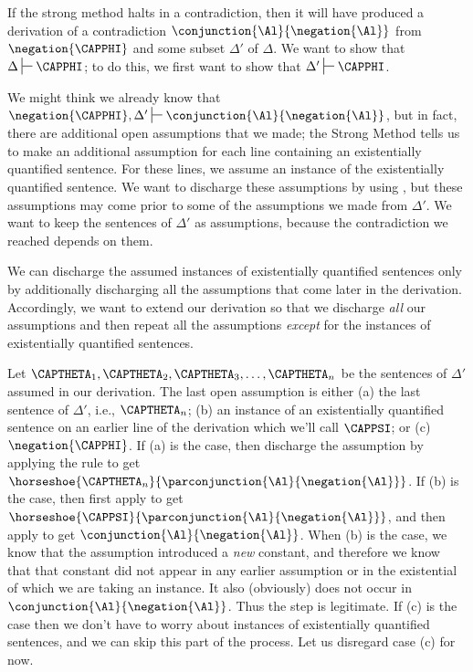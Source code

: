 \begin{PROOF}
If the strong method halts in a contradiction, then it will have produced a derivation of a contradiction $\conjunction{\Al}{\negation{\Al}}$ from $\negation{\CAPPHI}$ and some subset $\Delta'$ of $\Delta$.  We want to show that $\Delta\sststile{}{}\CAPPHI$; to do this, we first want to show that $\Delta'\sststile{}{}\CAPPHI$.

We might think we already know that $\negation{\CAPPHI},\Delta'\sststile{}{}\conjunction{\Al}{\negation{\Al}}$, but in fact, there are additional open assumptions that we made; the Strong Method tells us to make an additional assumption for each line containing an existentially quantified sentence. For these lines, we assume an instance of the existentially quantified sentence.  We want to discharge these assumptions by using , but these assumptions may come prior to some of the assumptions we made from $\Delta'$.  We want to keep the sentences of $\Delta'$ as assumptions, because the contradiction we reached depends on them. 

We can discharge the assumed instances of existentially quantified sentences only by additionally discharging all the assumptions that come later in the derivation.  Accordingly, we want to extend our derivation so that we discharge \emph{all} our assumptions and then repeat all the assumptions \emph{except} for the instances of existentially quantified sentences. 

Let $\CAPTHETA_1, \CAPTHETA_2, \CAPTHETA_3, \ldots, \CAPTHETA_{\integer{n}}$ be the sentences of $\Delta'$ assumed in our derivation.  The last open assumption is either (a) the last sentence of $\Delta'$, i.e., $\CAPTHETA_{\integer{n}}$; (b) an instance of an existentially quantified sentence on an earlier line of the derivation which we'll call $\CAPPSI$; or (c) $\negation{\CAPPHI}$.  If (a) is the case, then discharge the assumption by applying the rule  to get $\horseshoe{\CAPTHETA_{\integer{n}}}{\parconjunction{\Al}{\negation{\Al}}}$.  If (b) is the case, then first apply  to get $\horseshoe{\CAPPSI}{\parconjunction{\Al}{\negation{\Al}}}$, and then apply  to get $\conjunction{\Al}{\negation{\Al}}$.  When (b) is the case, we know that the assumption introduced a \emph{new} constant, and therefore we know that that constant did not appear in any earlier assumption or in the existential of which we are taking an instance.
It also (obviously) does not occur in $\conjunction{\Al}{\negation{\Al}}$.
Thus the  step is legitimate. If (c) is the case then we don't have to worry about instances of existentially quantified sentences, and we can skip this part of the process.  Let us disregard case (c) for now.


\end{PROOF}
